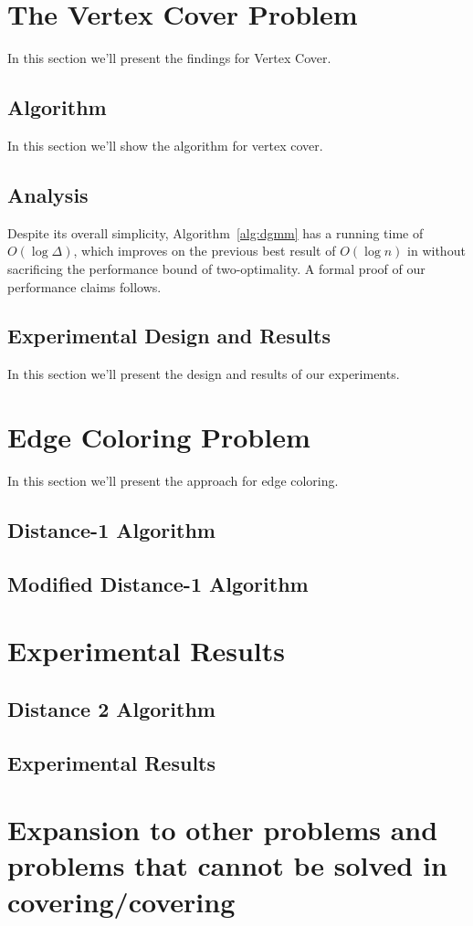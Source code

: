 \documentclass[twoside]{article}
\begin{document}
\section{The Vertex Cover Problem}

In this section we'll present the findings for Vertex Cover.

\subsection{Algorithm}

In this section we'll show the algorithm for vertex cover.

\subsection{Analysis}

\label{ssb:algorithms-dgmm-performance}

Despite its overall simplicity, Algorithm~\ref{alg:dgmm} has a running time of $O(\log \Delta)$, which improves on the previous best result of $O(\log n)$ in \cite{1582746} without sacrificing the performance bound of two-optimality. A formal proof of our performance claims follows.



\subsection{Experimental Design and Results}

In this section we'll present the design and results of our experiments.

\section{Edge Coloring Problem}

In this section we'll present the approach for edge coloring.

\subsection{Distance-1 Algorithm}

\subsection{Modified Distance-1 Algorithm}


\section{Experimental Results}


\subsection{Distance 2 Algorithm}
\subsection{Experimental Results}

\section{Expansion to other problems and problems that cannot be solved in covering/covering}



\end{document}
